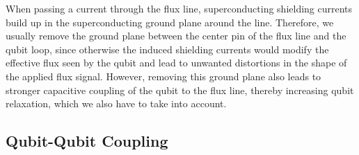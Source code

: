\smallskip

When passing a current through the flux line, superconducting shielding currents build up in the superconducting ground plane around the line. Therefore, we usually remove the ground plane between the center pin of the flux line and the qubit loop, since otherwise the induced shielding currents would modify the effective flux seen by the qubit and lead to unwanted distortions in the shape of the applied flux signal. However, removing this ground plane also leads to stronger capacitive coupling of the qubit to the flux line, thereby increasing qubit relaxation, which we also have to take into account.

\subsection{Qubit-Qubit Coupling} \label{section:qubit_qubit_coupling}


